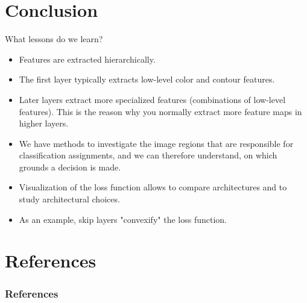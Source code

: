 \documentclass[xcolor=pdftex,dvipsnames,table]{beamer}
\begin{document}
\section{Conclusion}

\begin{frame}{What lessons do we learn?}
	\begin{itemize}
		\item Features are extracted hierarchically. 
		\item The first layer typically extracts low-level color and contour features.
		\item Later layers extract more specialized features (combinations of low-level features). This is the reason why you normally extract more feature maps in higher layers.
		\item We have methods to investigate the image regions that are responsible for classification assignments, and we can therefore understand, on which grounds a decision is made.
		\item Visualization of the loss function allows to compare architectures and to study architectural choices. 
		\item As an example, skip layers "convexify" the loss function.
	\end{itemize}
\end{frame}

\section{References}
\begin{frame}[allowframebreaks]
	\frametitle{References}
	
\end{frame}
\end{document}
